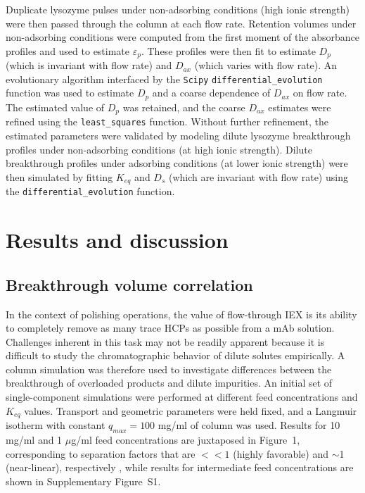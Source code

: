 \documentclass[preprint,review,12pt]{elsarticle}
\begin{document}
        Duplicate lysozyme pulses under non-adsorbing conditions (high ionic strength) were then passed through the column at each flow rate. Retention volumes under non-adsorbing conditions were computed from the first moment of the absorbance profiles and used to estimate $\varepsilon_p$. These profiles were then fit to estimate $D_p$ (which is invariant with flow rate) and $D_{ax}$ (which varies with flow rate). An evolutionary algorithm interfaced by the \texttt{Scipy} \texttt{differential\_evolution} function was used to estimate $D_p$ and a coarse dependence of $D_{ax}$ on flow rate. The estimated value of $D_p$ was retained, and the coarse $D_{ax}$ estimates were refined using the \texttt{least\_squares} function. Without further refinement, the estimated parameters were validated by modeling dilute lysozyme breakthrough profiles under non-adsorbing conditions (at high ionic strength). Dilute breakthrough profiles under adsorbing conditions (at lower ionic strength) were then simulated by fitting $K_{eq}$ and $D_s$ (which are invariant with flow rate) using the \texttt{differential\_evolution} function.


\section{Results and discussion} \label{sec:results}
    \subsection{Breakthrough volume correlation} \label{ssec:break vol corr}
        In the context of polishing operations, the value of flow-through IEX is its ability to completely remove as many trace HCPs as possible from a mAb solution. Challenges inherent in this task may not be readily apparent because it is difficult to study the chromatographic behavior of dilute solutes empirically. A column simulation was therefore used to investigate differences between the breakthrough of overloaded products and dilute impurities. An initial set of single-component simulations were performed at different feed concentrations and $K_{eq}$ values. Transport and geometric parameters were held fixed, and a Langmuir isotherm with constant $q_{max} = 100$ mg/ml of column was used. Results for 10 mg/ml and 1 $\mu$g/ml feed concentrations are juxtaposed in Figure~1, corresponding to separation factors that are $<< 1$ (highly favorable) and $\sim$1 (near-linear), respectively \cite{perrys}, while results for intermediate feed concentrations are shown in Supplementary Figure~S1.
\end{document}
